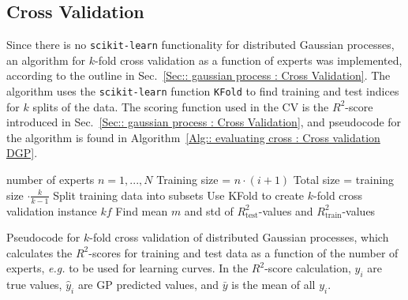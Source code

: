 \documentclass[twoside,english]{uiofysmaster}
\begin{document}
{\subsection{Cross Validation}

Since there is no \verb|scikit-learn| functionality for distributed Gaussian processes, an algorithm for $k$-fold cross validation as a function of experts was implemented, according to the outline in Sec.~\ref{Sec:: gaussian process : Cross Validation}. The algorithm uses the \verb|scikit-learn| function \verb|KFold| to find training and test indices for $k$ splits of the data. The scoring function used in the CV is the $R^2$-score introduced in Sec.~\ref{Sec:: gaussian process : Cross Validation}, and pseudocode for the algorithm is found in Algorithm~\ref{Alg:: evaluating cross : Cross validation DGP}. 



\begin{algorithm}
number of experts $n = 1,...,N$ \;
{
Training size =  $n \cdot (i+1)$\;
Total size = training size $\cdot \frac{k}{k-1}$\;
Split training data into subsets\;
Use KFold to create $k$-fold cross validation instance $kf$\;
Find mean $m$ and std of $R^2_{\text{test}}$-values and $R^2_{\text{train}}$-values
}
 \caption{Pseudocode for $k$-fold cross validation of distributed Gaussian processes, which calculates the $R^2$-scores for training and test data as a function of the number of experts, \textit{e.g.} to be used for learning curves. In the $R^2$-score calculation, $y_i$ are true values, $\hat{y}_i$ are GP predicted values, and $\bar{y}$ is the mean of all $y_i$.}
\label{Alg:: evaluating cross : Cross validation DGP}
\end{algorithm}



}
\end{document}
